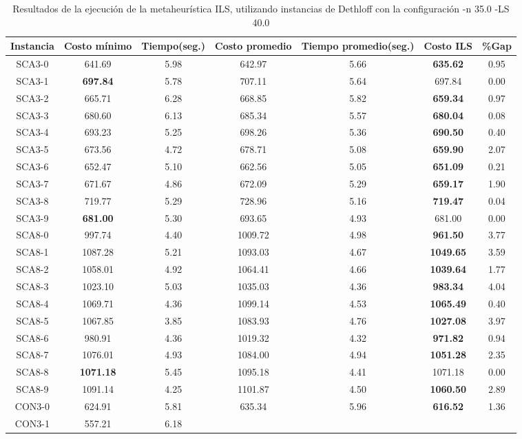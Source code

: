 \begin{table}[ht]
\caption{Resultados de la ejecución de la metaheurística ILS, utilizando instancias de Dethloff con la configuración -n 35.0 -LS 40.0}
\centering
\small
\begin{tabular}{c c c c c c c}
\hline\hline
Instancia & Costo mínimo & Tiempo(seg.) & Costo promedio & Tiempo promedio(seg.) & Costo ILS & \%Gap \\ [0.5ex]
\hline
SCA3-0 & 641.69 & 5.98 & 
642.97 & 5.66 & \bf{635.62} & 
0.95\\SCA3-1 & \bf{697.84} & 5.78 & 
707.11 & 5.64 & 697.84 & 0.00\\
SCA3-2 & 665.71 & 6.28 & 
668.85 & 5.82 & \bf{659.34} & 
0.97\\SCA3-3 & 680.60 & 6.13 & 
685.34 & 5.57 & \bf{680.04} & 
0.08\\SCA3-4 & 693.23 & 5.25 & 
698.26 & 5.36 & \bf{690.50} & 
0.40\\SCA3-5 & 673.56 & 4.72 & 
678.71 & 5.08 & \bf{659.90} & 
2.07\\SCA3-6 & 652.47 & 5.10 & 
662.56 & 5.05 & \bf{651.09} & 
0.21\\SCA3-7 & 671.67 & 4.86 & 
672.09 & 5.29 & \bf{659.17} & 
1.90\\SCA3-8 & 719.77 & 5.29 & 
728.96 & 5.16 & \bf{719.47} & 
0.04\\SCA3-9 & \bf{681.00} & 5.30 & 
693.65 & 4.93 & 681.00 & 0.00\\
SCA8-0 & 997.74 & 4.40 & 
1009.72 & 4.98 & \bf{961.50} & 
3.77\\SCA8-1 & 1087.28 & 5.21 & 
1093.03 & 4.67 & \bf{1049.65} & 
3.59\\SCA8-2 & 1058.01 & 4.92 & 
1064.41 & 4.66 & \bf{1039.64} & 
1.77\\SCA8-3 & 1023.10 & 5.03 & 
1035.03 & 4.36 & \bf{983.34} & 
4.04\\SCA8-4 & 1069.71 & 4.36 & 
1099.14 & 4.53 & \bf{1065.49} & 
0.40\\SCA8-5 & 1067.85 & 3.85 & 
1083.93 & 4.76 & \bf{1027.08} & 
3.97\\SCA8-6 & 980.91 & 4.36 & 
1019.32 & 4.32 & \bf{971.82} & 
0.94\\SCA8-7 & 1076.01 & 4.93 & 
1084.00 & 4.94 & \bf{1051.28} & 
2.35\\SCA8-8 & \bf{1071.18} & 5.45 & 
1095.18 & 4.41 & 1071.18 & 0.00\\
SCA8-9 & 1091.14 & 4.25 & 
1101.87 & 4.50 & \bf{1060.50} & 
2.89\\CON3-0 & 624.91 & 5.81 & 
635.34 & 5.96 & \bf{616.52} & 
1.36\\CON3-1 & 557.21 & 6.18 & 

\end{tabular}
\end{table}
